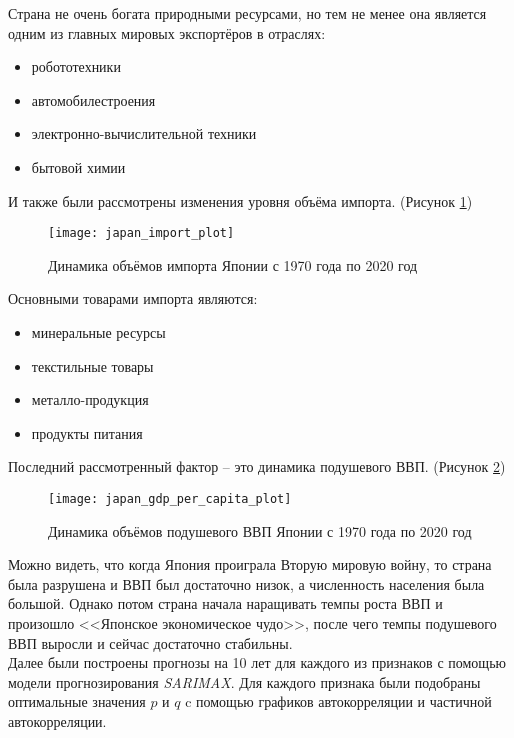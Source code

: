 Страна не очень богата природными ресурсами, но тем не менее она является одним из главных мировых экспортёров в отраслях:
\begin{itemize}[topsep=0pt,itemsep=-1ex,partopsep=1ex,parsep=1ex]
	\item робототехники
	\item автомобилестроения
	\item электронно-вычислительной техники
	\item бытовой химии\\
\end{itemize}

И также были рассмотрены изменения уровня объёма импорта. (Рисунок \ref{fig:japan_import_plot})

\begin{figure}[h]
	\centering \texttt{[image: japan\_import\_plot]}
	\caption{Динамика объёмов импорта Японии с 1970 года по 2020 год}
	\label{fig:japan_import_plot}
\end{figure}

\newpage

Основными товарами импорта являются:
\begin{itemize}[topsep=0pt,itemsep=-1ex,partopsep=1ex,parsep=1ex]
	\item минеральные ресурсы
	\item текстильные товары
	\item металло-продукция
	\item продукты питания\\
\end{itemize}

Последний рассмотренный фактор -- это динамика подушевого ВВП. (Рисунок \ref{fig:japan_gdp_per_capita_plot})

\begin{figure}[h]
	\centering \texttt{[image: japan\_gdp\_per\_capita\_plot]}
	\caption{Динамика объёмов подушевого ВВП Японии с 1970 года по 2020 год}
	\label{fig:japan_gdp_per_capita_plot}
\end{figure}

Можно видеть, что когда Япония проиграла Вторую мировую войну, то страна была разрушена и ВВП был достаточно низок, а численность населения была большой. Однако потом страна начала наращивать темпы роста ВВП и произошло <<Японское экономическое чудо>>, после чего темпы подушевого ВВП выросли и сейчас достаточно стабильны.\\

Далее были построены прогнозы на 10 лет для каждого из признаков с помощью модели прогнозирования \textit{SARIMAX}. Для каждого признака были подобраны оптимальные значения $p$ и $q$ c помощью графиков автокорреляции и частичной автокорреляции.\\

